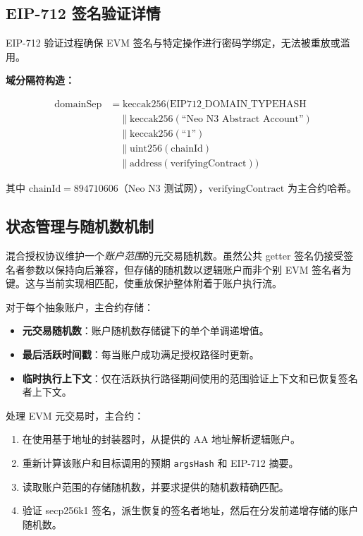\documentclass[10pt]{article}
\newcommand{\code}[1]{\texttt{\small #1}}
\begin{document}
\subsection{EIP-712 签名验证详情}

EIP-712 验证过程确保 EVM 签名与特定操作进行密码学绑定，无法被重放或滥用。

\textbf{域分隔符构造：}
\begin{small}
\begin{align*}
\text{domainSep} &= \text{keccak256}(\text{EIP712\_DOMAIN\_TYPEHASH} \\
&\quad \| \text{keccak256}(\text{``Neo N3 Abstract Account''}) \\
&\quad \| \text{keccak256}(\text{``1''}) \\
&\quad \| \text{uint256}(\text{chainId}) \\
&\quad \| \text{address}(\text{verifyingContract}))
\end{align*}
\end{small}

其中 $\text{chainId} = 894710606$（Neo N3 测试网），$\text{verifyingContract}$ 为主合约哈希。

\subsection{状态管理与随机数机制}

混合授权协议维护一个\emph{账户范围}的元交易随机数。虽然公共 getter 签名仍接受签名者参数以保持向后兼容，但存储的随机数以逻辑账户而非个别 EVM 签名者为键。这与当前实现相匹配，使重放保护整体附着于账户执行流。

对于每个抽象账户，主合约存储：
\begin{itemize}
  \item \textbf{元交易随机数}：账户随机数存储键下的单个单调递增值。
  \item \textbf{最后活跃时间戳}：每当账户成功满足授权路径时更新。
  \item \textbf{临时执行上下文}：仅在活跃执行路径期间使用的范围验证上下文和已恢复签名者上下文。
\end{itemize}

处理 EVM 元交易时，主合约：
\begin{enumerate}
  \item 在使用基于地址的封装器时，从提供的 AA 地址解析逻辑账户。
  \item 重新计算该账户和目标调用的预期 \code{argsHash} 和 EIP-712 摘要。
  \item 读取账户范围的存储随机数，并要求提供的随机数精确匹配。
  \item 验证 secp256k1 签名，派生恢复的签名者地址，然后在分发前递增存储的账户随机数。
\end{enumerate}
\end{document}
